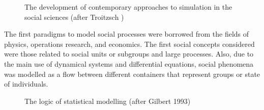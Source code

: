 \documentclass[11pt,oneside,a4paper,openright]{report}
\begin{document}
\begin{figure}[h]
\centering
\setlength\fboxsep{0pt}
\setlength\fboxrule{0.5pt}
\caption{The development of contemporary approaches to simulation in the social sciences (after Troitzsch )\cite{GilbertTroitzsch}}
\label{fig:SimAppGilbTro}
\end{figure}


The first paradigms to model social processes were borrowed from the fields of physics, operations research, and economics. The first social concepts considered were those related to social units or subgroups and large processes. Also, due to the main use of dynamical systems and differential equations, social phenomena was modelled as a flow between different containers that represent groups or state of individuals.\\

\begin{figure}[h]
\centering
\setlength\fboxsep{0pt}
\setlength\fboxrule{0.5pt}
\caption{The logic of statistical modelling (after Gilbert 1993)\cite{GilbertTroitzsch}}
\label{fig:SimStatMod}
\end{figure}
\end{document}
